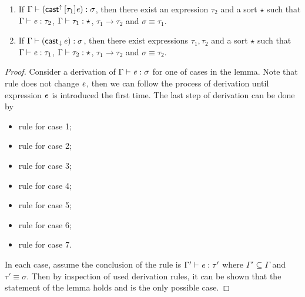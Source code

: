 \begin{lem}
\begin{enumerate}[(1)]
	\item If $\Gamma  \vdash  (  \mathsf{cast}^{\uparrow} \, [  \tau_{{\mathrm{1}}}  ]  \mathit{e}  )  :  \sigma$, then there exist an expression $\tau_{{\mathrm{2}}}$ and a sort $\star$ such that $\Gamma  \vdash  \mathit{e}  :  \tau_{{\mathrm{2}}}$, $\Gamma  \vdash  \tau_{{\mathrm{1}}}  :  \star$, $\tau_{{\mathrm{1}}}  \longrightarrow  \tau_{{\mathrm{2}}}$ and $\sigma  \equiv  \tau_{{\mathrm{1}}}$.
	\item If $\Gamma  \vdash  (  \mathsf{cast}_{\downarrow} \, \mathit{e}  )  :  \sigma$, then there exist expressions $\tau_{{\mathrm{1}}},\tau_{{\mathrm{2}}}$ and a sort $\star$ such that $\Gamma  \vdash  \mathit{e}  :  \tau_{{\mathrm{1}}}$, $\Gamma  \vdash  \tau_{{\mathrm{2}}}  :  \star$, $\tau_{{\mathrm{1}}}  \longrightarrow  \tau_{{\mathrm{2}}}$ and $\sigma  \equiv  \tau_{{\mathrm{2}}}$.
\end{enumerate}
\end{lem}

\begin{proof}
    Consider a derivation of $\Gamma  \vdash  \mathit{e}  :  \sigma$ for one of cases in the lemma. Note that rule  does not change $\mathit{e}$, then we can follow the process of derivation until expression $\mathit{e}$ is introduced the first time. The last step of derivation can be done by
    \begin{itemize}
        \item rule  for case 1;
        \item rule  for case 2;
        \item rule  for case 3;
        \item rule  for case 4;
        \item rule  for case 5;
        \item rule  for case 6;
        \item rule  for case 7.
    \end{itemize}
    In each case, assume the conclusion of the rule is $\Gamma'  \vdash  \mathit{e}  :  \tau'$ where $\Gamma' \subseteq \Gamma$ and $\tau'  \equiv  \sigma$. Then by inspection of used derivation rules, it can be shown that the statement of the lemma holds and is the only possible case.
\end{proof}

